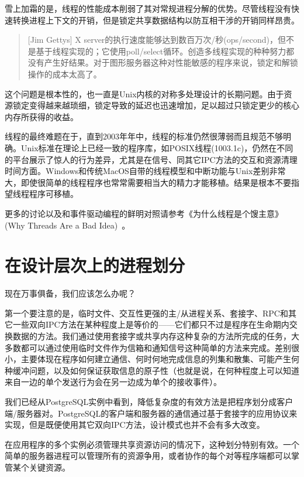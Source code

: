 \documentclass[12pt,oneside]{ctexbook}
\begin{document}
\begin{common-format}
雪上加霜的是，线程的性能成本削弱了其对常规进程分解的优势。尽管线程没有快速转换进程上下文的开销，但是锁定共享数据结构以防互相干涉的开销同样昂贵。

\begin{quote}[Jim Gettys]
X server的执行速度能够达到数百万次/秒(ops/second)\linebreak ，但不是基于线程实现的；它使用poll/select循环。创造多线程实现的种种努力都没有产生好结果。对于图形服务器这种对性能敏感的程序来说，锁定和解锁操作的成本太高了。
\end{quote}

这个问题是根本性的，也一直是Unix内核的对称多处理设计的长期问题。由于资源锁定变得越来越琐细，锁定导致的延迟也迅速增加，足以超过只锁定更少的核心内存所获得的收益。

线程的最终难题在于，直到2003年年中，线程的标准仍然很薄弱而且规范不够明确。Unix标准在理论上已经一致的程序库，如POSIX线程(1003.1c)，仍然在不同的平台展示了惊人的行为差异，尤其是在信号、同其它IPC方法的交互和资源清理时间方面。Windows和传统MacOS自带的线程模型和中断功能与Unix差别非常大，即使很简单的线程程序也常常需要相当大的精力才能移植。结果是根本不要指望线程程序可移植。

更多的讨论以及和事件驱动编程的鲜明对照请参考《为什么线程是个馊主意》(Why Threads Are a Bad Idea)~\cite{Ousterhout96}。


\section{在设计层次上的进程划分}
现在万事俱备，我们应该怎么办呢？

第一个要注意的是，临时文件、交互性更强的主/从进程关系、套接字、RPC和其它一些双向IPC方法在某种程度上是等价的——它们都只不过是程序在生命期内交换数据的方法。我们通过使用套接字或共享内存这种复杂的方法所完成的任务，大多数都可以通过使用临时文件作为信箱和通知信号这种简单的方法来完成。差别很小，主要体现在程序如何建立通信、何时何地完成信息的列集和散集、可能产生何种缓冲问题，以及如何保证获取信息的原子性（也就是说，在何种程度上可以知道来自一边的单个发送行为会在另一边成为单个的接收事件）。

我们已经从PostgreSQL实例中看到，降低复杂度的有效方法是把程序划分成客户端/服务器对。PostgreSQL的客户端和服务器的通信通过基于套接字的应用协议来实现，但是既便使用其它双向IPC方法，设计模式也并不会有多大改变。

在应用程序的多个实例必须管理共享资源访问的情况下，这种划分特别有效。一个简单的服务器进程可以管理所有的资源争用，或者协作的每个对等程序端都可以掌管某个关键资源。


\end{common-format}
\end{document}
